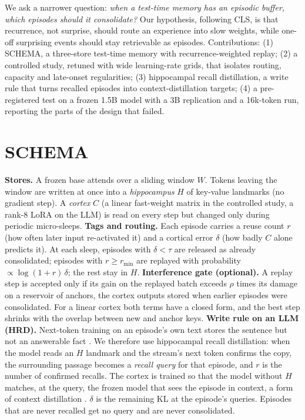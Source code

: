 \documentclass[letterpaper,10pt,twocolumn]{article}
\begin{document}
We ask a narrower question: \emph{when a test-time memory has an episodic buffer, which episodes should it consolidate?} Our hypothesis, following CLS, is that recurrence, not surprise, should route an experience into slow weights, while one-off surprising events should stay retrievable as episodes. Contributions: (1) SCHEMA, a three-store test-time memory with recurrence-weighted replay; (2) a controlled study, retuned with wide learning-rate grids, that isolates routing, capacity and late-onset regularities; (3) hippocampal recall distillation, a write rule that turns recalled episodes into context-distillation targets; (4) a pre-registered test on a frozen 1.5B model with a 3B replication and a 16k-token run, reporting the parts of the design that failed.

\section{SCHEMA}
\textbf{Stores.} A frozen base attends over a sliding window $W$. Tokens leaving the window are written at once into a \emph{hippocampus} $H$ of key-value landmarks (no gradient step). A \emph{cortex} $C$ (a linear fast-weight matrix in the controlled study, a rank-8 LoRA on the LLM) is read on every step but changed only during periodic micro-sleeps.
\textbf{Tags and routing.} Each episode carries a reuse count $r$ (how often later input re-activated it) and a cortical error $\delta$ (how badly $C$ alone predicts it). At each sleep, episodes with $\delta<\tau$ are released as already consolidated; episodes with $r\geq r_{\min}$ are replayed with probability $\propto \log(1+r)\,\delta$; the rest stay in $H$.
\textbf{Interference gate (optional).} A replay step is accepted only if its gain on the replayed batch exceeds $\rho$ times its damage on a reservoir of anchors, the cortex outputs stored when earlier episodes were consolidated. For a linear cortex both terms have a closed form, and the best step shrinks with the overlap between new and anchor keys.
\textbf{Write rule on an LLM (HRD).} Next-token training on an episode's own text stores the sentence but not an answerable fact \cite{allenzhu}. We therefore use hippocampal recall distillation: when the model reads an $H$ landmark and the stream's next token confirms the copy, the surrounding passage becomes a \emph{recall query} for that episode, and $r$ is the number of confirmed recalls. The cortex is trained so that the model without $H$ matches, at the query, the frozen model that sees the episode in context, a form of context distillation \cite{snell,padmanabhan}. $\delta$ is the remaining KL at the episode's queries. Episodes that are never recalled get no query and are never consolidated.
\end{document}
